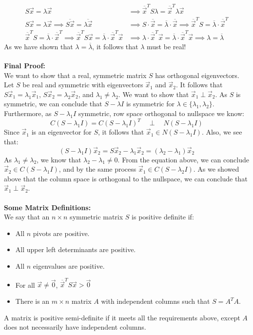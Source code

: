 \documentclass[12pt]{amsart}
\begin{document}
\begin{align*}
	S\vec{x} = \lambda \vec{x} &\implies \overline{\vec{x}}^TS\lambda = \overline{\vec{x}}^T\lambda \vec{x}\\
	S\vec{x} = \lambda \vec{x} \implies \overline{S\vec{x}} = \overline{\lambda \vec{x}} &\implies 
	S\cdot\overline{\vec{x}} = \overline{\lambda }\cdot\overline{\vec{x}} \implies 
	\overline{\vec{x}}^TS = \overline{\lambda }\cdot\overline{\vec{x}}^T\\
	\overline{\vec{x}}^TS = \overline{\lambda }\cdot\overline{\vec{x}}^T \implies 
	\overline{\vec{x}}^TS\vec{x} = \overline{\lambda }\cdot\overline{\vec{x}}^T\vec{x} &\implies \lambda \cdot\overline{\vec{x}}^T\vec{x} = \overline{\lambda} \cdot\overline{\vec{x}}^T \vec{x} \implies \lambda = \overline{\lambda}
\end{align*}
As we have shown that $\lambda = \overline{\lambda}$, it follows that $\lambda$ must be real!\\
\\
\textbf{Final Proof:}\\
We want to show that a real, symmetric matrix $S$ has orthogonal eigenvectors. Let $S$ be real and symmetric with eigenvectors $\vec{x}_1$ and $\vec{x}_2$. It follows that $S\vec{x}_1 = \lambda_1\vec{x}_1$, $S\vec{x}_2 = \lambda_2\vec{x}_2$, and $\lambda_1 \neq \lambda_2$. We want to show that $\vec{x}_1 \perp \vec{x}_2$. As $S$ is symmetric, we can conclude that $S - \lambda I$ is symmetric for $\lambda \in \{\lambda_1, \lambda_2\}$. Furthermore, as $S - \lambda_1 I$ symmetric, row space orthogonal to nullspace we know:
\[C(S - \lambda_1 I) = C(S - \lambda_1 I)^T \quad  \perp \quad N(S - \lambda_1 I)\] 
Since $\vec{x}_1$ is an eigenvector for $S$,  it follows that $\vec{x}_1 \in N(S - \lambda_1 I)$. Also, we see that:
\[(S - \lambda_1 I)\vec{x}_2 = S\vec{x}_2 - \lambda_1\vec{x}_2 = (\lambda_2 - \lambda_1)\vec{x}_2\]
As $\lambda_1 \neq \lambda_2$, we know that $\lambda_2 - \lambda_1 \neq 0$. From the equation above, we can conclude $\vec{x}_2 \in C(S - \lambda_1 I)$, and by the same process $\vec{x}_1 \in C(S - \lambda_2 I)$. As we showed above that the column space is orthogonal to the nullspace, we can conclude that $\vec{x}_1 \perp \vec{x}_2$.
\\ \\
\textbf{Some Matrix Definitions:}\\
We say that an $n \times n$ symmetric matrix $S$ is positive definite if:
\begin{itemize}
	\item All $n$ pivots are positive.
	\item All upper left determinants are positive.
	\item All $n$ eigenvalues are positive.
	\item For all $\vec{x}\neq\vec{0}$, $\overline{\vec{x}}^T S \vec{x} > \vec{0}$
	\item There is an $m \times n$ matrix $A$ with independent columns such that $S = A^TA$.
\end{itemize}
A matrix is positive semi-definite if it meets all the requirements above, except $A$ does not necessarily have independent columns.
\end{document}
